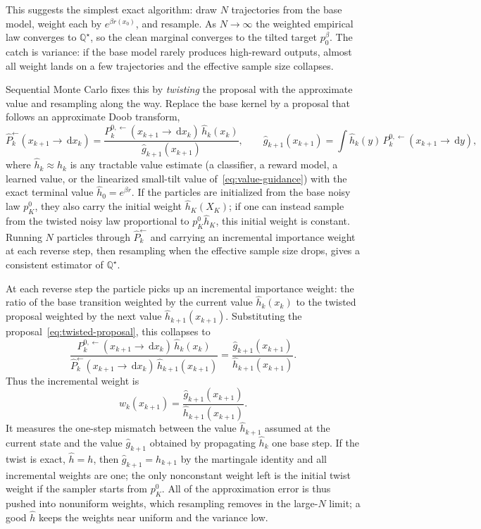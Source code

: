 \documentclass[10pt,a4paper]{amsart}
\numberwithin{equation}{section}
\newcommand{\dd}{\,\mathrm{d}}
\newcommand{\wh}[1]{\widehat{#1}}
\begin{document}
This suggests the simplest exact algorithm: draw $N$ trajectories from the base
model, weight each by $e^{\beta r(x_0)}$, and resample.  As $N\to\infty$ the
weighted empirical law converges to $\mathbb Q^\star$, so the clean marginal
converges to the tilted target $p_0^\beta$.  The catch is variance: if the base
model rarely produces high-reward outputs, almost all weight lands on a few
trajectories and the effective sample size collapses.

Sequential Monte Carlo fixes this by \emph{twisting} the proposal with the
approximate value and resampling along the way.  Replace the base kernel by a
proposal that follows an approximate Doob transform,
\begin{equation}\label{eq:twisted-proposal}
    \wh P_k^{\leftarrow}(x_{k+1}\to \dd x_k)
    =
    \frac{P_k^{0,\leftarrow}(x_{k+1}\to \dd x_k)\,\wh h_k(x_k)}
    {\wh g_{k+1}(x_{k+1})},
    \qquad
    \wh g_{k+1}(x_{k+1})=\int \wh h_k(y)\,
    P_k^{0,\leftarrow}(x_{k+1}\to \dd y),
\end{equation}
where $\wh h_k\approx h_k$ is any tractable value estimate (a classifier, a
reward model, a learned value, or the linearized small-tilt value
of~\eqref{eq:value-guidance}) with the exact terminal value
$\wh h_0=e^{\beta r}$.  If the particles are initialized from the base noisy
law $p_K^0$, they also carry the initial weight $\wh h_K(X_K)$; if one can
instead sample from the twisted noisy law proportional to $p_K^0\wh h_K$, this
initial weight is constant.  Running $N$ particles through $\wh P_k^{\leftarrow}$ and
carrying an incremental importance weight at each reverse step, then resampling
when the effective sample size drops, gives a consistent estimator of
$\mathbb Q^\star$.

At each reverse step the particle picks up an incremental importance weight: the
ratio of the base transition weighted by the current value $\wh h_k(x_k)$ to the
twisted proposal weighted by the next value $\wh h_{k+1}(x_{k+1})$.  Substituting
the proposal~\eqref{eq:twisted-proposal}, this collapses to
\[
    \frac{
    P_k^{0,\leftarrow}(x_{k+1}\to \dd x_k)\,\wh h_k(x_k)}
    {
    \wh P_k^{\leftarrow}(x_{k+1}\to \dd x_k)\,\wh h_{k+1}(x_{k+1})}
    =
    \frac{\wh g_{k+1}(x_{k+1})}{\wh h_{k+1}(x_{k+1})}.
\]
Thus the incremental weight is
\begin{equation}\label{eq:smc-incremental-weight}
    w_k(x_{k+1})
    =
    \frac{\wh g_{k+1}(x_{k+1})}{\wh h_{k+1}(x_{k+1})}.
\end{equation}
It measures the one-step mismatch between the value $\wh h_{k+1}$ assumed at the
current state and the value $\wh g_{k+1}$ obtained by propagating $\wh h_k$ one
base step.  If the twist is exact, $\wh h=h$, then $\wh g_{k+1}=h_{k+1}$ by the
martingale identity and all incremental weights are one; the only nonconstant
weight left is the initial twist weight if the sampler starts from $p_K^0$.
All of the approximation error is thus pushed into nonuniform weights, which
resampling removes in the large-$N$ limit; a good $\wh h$ keeps the weights near
uniform and the variance low.
\end{document}

